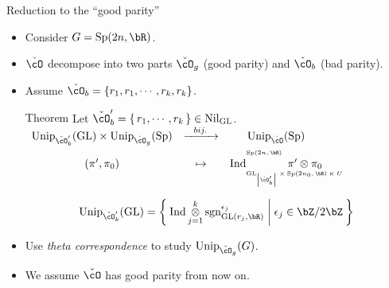 \documentclass[t,11pt,usenames,dvipsnames]{beamer}
\theoremstyle{plain}
\theoremstyle{definition}
\def\sgn{{\rm sgn}}
\def\abs#1{\left|{#1}\right|}
\def\GL{\mathrm{GL}}
\def\Ind{{\rm Ind}}
\def\Sp{{\mathrm{Sp}}}
\def\Unip{{\mathrm{Unip}}}
\def\ckcO{{\check{\cO}}}
\def\Nil{\mathrm{Nil}}
\def\blue{\color{blue}}
\def\red{\color{red}}
\let\oldemph\emph
\def\emph#1{\oldemph{\blue #1}}
\begin{document}
    \begin{frame}{Reduction to the ``good parity''}
        \begin{itemize}
            \item Consider $G= \Sp(2n,\bR)$. 
            \item  $\ckcO$ decompose into two parts $\ckcO_{g}$ (good parity)  and $\ckcO_{b}$ (bad parity).
            \item Assume $\ckcO_{b} = \{r_1, r_1, \cdots, r_k, r_k\}$.\pause
            \begin{block}{ Theorem {\color{black}Let $\ckcO'_b = \set{r_1,\cdots, r_k}\in \Nil_{\GL}$.}}
              \hspace{2em}
              $
            \begin{array}{ccc}
                {\tiny\Unip_{\ckcO'_b}(\GL)
                \times \Unip_{\ckcO_g}(\Sp)} &\xrightarrow{\ \ bij.\ \ }&
                {\tiny \Unip_{\ckcO}(\Sp)} \\[.6em]
                (\pi',\pi_0 ) &\mapsto & 
                \Ind_{\raisebox{-0.5em}{\tiny$\GL_{\abs{\ckcO'_b}}\times \Sp(2n_0,\bR)\ltimes U$}}^{\tiny\raisebox{1em}{$\Sp(2n,\bR)$}}
                \hspace{-5em}\pi'\otimes \pi_0
            \end{array}
            $
          \end{block}
          \vspace{-1em}
            \[
            \begin{split}
                {\tiny\Unip_{\ckcO'_b}(\GL)}
                = 
                \Set{\Ind \mathop{\otimes}_{j=1}^k \sgn^{\epsilon_j}_{\GL(r_j,\bR)}
                |\epsilon_j \in \bZ/2\bZ}
            \end{split}
            \]
            \pause
            \item Use \emph{theta correspondence}  to study 
            $ \Unip_{\ckcO_{g}}(G)$.
            \item We assume  $\ckcO$ has {\red good parity} from now on.
        \end{itemize}
    \end{frame}
    
\end{document}
